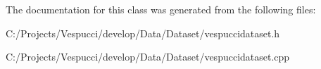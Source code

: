 The documentation for this class was generated from the following files\+:\begin{DoxyCompactItemize}
\item 
C\+:/\+Projects/\+Vespucci/develop/\+Data/\+Dataset/vespuccidataset.\+h\item 
C\+:/\+Projects/\+Vespucci/develop/\+Data/\+Dataset/vespuccidataset.\+cpp\end{DoxyCompactItemize}
